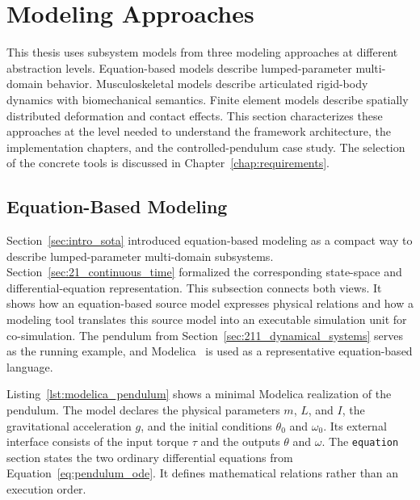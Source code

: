 \section{Modeling Approaches}
\label{sec:24_modeling_approaches}

This thesis uses subsystem models from three modeling approaches at different abstraction levels.
Equation-based models describe lumped-parameter multi-domain behavior.
Musculoskeletal models describe articulated rigid-body dynamics with biomechanical semantics.
Finite element models describe spatially distributed deformation and contact effects.
This section characterizes these approaches at the level needed to understand the framework architecture, the implementation chapters, and the controlled-pendulum case study.
The selection of the concrete tools is discussed in Chapter~\ref{chap:requirements}.

\subsection{Equation-Based Modeling}
\label{sec:241_modeling_equation_based}

Section~\ref{sec:intro_sota} introduced equation-based modeling as a compact way to describe lumped-parameter multi-domain subsystems.
Section~\ref{sec:21_continuous_time} formalized the corresponding state-space and differential-equation representation.
This subsection connects both views.
It shows how an equation-based source model expresses physical relations and how a modeling tool translates this source model into an executable simulation unit for co-simulation.
The pendulum from Section~\ref{sec:211_dynamical_systems} serves as the running example, and Modelica~\cite{Modelica_Fritzson} is used as a representative equation-based language.

Listing~\ref{lst:modelica_pendulum} shows a minimal Modelica realization of the pendulum.
The model declares the physical parameters $m$, $L$, and $I$, the gravitational acceleration $g$, and the initial conditions $\theta_0$ and $\omega_0$.
Its external interface consists of the input torque $\tau$ and the outputs $\theta$ and $\omega$.
The \texttt{equation} section states the two ordinary differential equations from Equation~\eqref{eq:pendulum_ode}.
It defines mathematical relations rather than an execution order.

